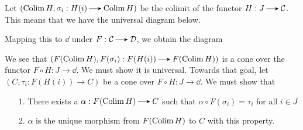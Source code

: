     \begin{prf}
        Let $(\Colim H, \sigma_i: H(i) \to \Colim H)$ be the colimit
        of the functor $H: J \to \cc$. This means that we have the universal diagram below. 
        \begin{center}
        \end{center}        
        Mapping this to $\dd$ under $F: \cc \to \dd$, we obtain the diagram 
        \begin{center}
        \end{center}    
        We see that $(F(\Colim H), F(\sigma_i): F(H(i)) \to F(\Colim H))$ 
        is a cone over the functor $F \circ H: J \to \dd$.
        We must show it is universal. Towards that goal, 
        let $(C, \tau_i: F(H(i)) \to C)$ 
        be a cone over $F \circ H: J \to \dd$. 
        We must show that 
        \begin{itemize}
            \item[1.] There exists a $\alpha: F(\Colim H) \to C$ such that 
            $\alpha \circ F(\sigma_i) = \tau_i$ for all $i \in J$
            \item[2.] $\alpha$ is the unique morphism from $F(\operatorname*{\mathrm{Colim }} H)$ to $C$ with 
            this property.  
        \end{itemize}

\end{prf}
